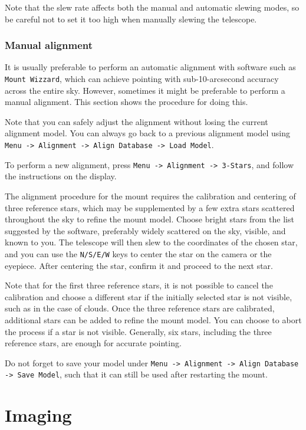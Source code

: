 \documentclass[a4paper, 11pt, fleqn]{memoir}
\begin{document}
Note that the slew rate affects both the manual and automatic slewing modes, so be careful not to set it too high when manually slewing the telescope.

\subsection{Manual alignment}

It is usually preferable to perform an automatic alignment with software such as \texttt{Mount Wizzard}, which can achieve pointing with sub-10-arcsecond accuracy across the entire sky.
However, sometimes it might be preferable to perform a manual alignment.
This section shows the procedure for doing this.

Note that you can safely adjust the alignment without losing the current alignment model.
You can always go back to a previous alignment model using \texttt{Menu -> Alignment -> Align Database -> Load Model}.

To perform a new alignment, press \texttt{Menu -> Alignment -> 3-Stars}, and follow the instructions on the display.

The alignment procedure for the mount requires the calibration and centering of three reference stars, which may be supplemented by a few extra stars scattered throughout the sky to refine the mount model.
Choose bright stars from the list suggested by the software, preferably widely scattered on the sky, visible, and known to you.
The telescope will then slew to the coordinates of the chosen star, and you can use the \texttt{N/S/E/W} keys to center the star on the camera or the eyepiece.
After centering the star, confirm it and proceed to the next star.

Note that for the first three reference stars, it is not possible to cancel the calibration and choose a different star if the initially selected star is not visible, such as in the case of clouds.
Once the three reference stars are calibrated, additional stars can be added to refine the mount model.
You can choose to abort the process if a star is not visible.
Generally, six stars, including the three reference stars, are enough for accurate pointing.

Do not forget to save your model under \texttt{Menu -> Alignment -> Align Database -> Save Model}, such that it can still be used after restarting the mount.

\chapter{Imaging}
\end{document}

